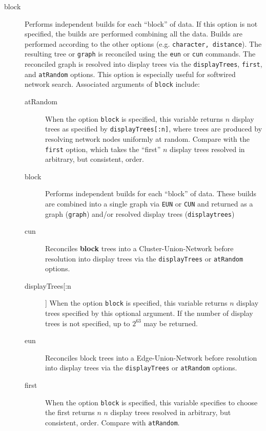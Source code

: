 	\begin{description}

		\item[block] Performs independent builds for each ``block'' of data. If this option 
		is not specified, the builds are performed combining all the data. Builds are performed 
		according 	to the other options (e.g. \texttt{character, distance}). The resulting tree 
		or \texttt{graph} is reconciled using the \texttt{eun} or \texttt{cun} commands. The 
		reconciled graph is resolved into display trees via the \texttt{displayTrees}, \texttt{first}, 
		and \texttt{atRandom} options. This option is especially useful for softwired network search. 
		Associated arguments of \texttt{block} include:
				
		\begin{description}
			\item[atRandom] When the option \texttt{block} is specified, this variable returns $n$ 
			display trees as specified by \texttt{displayTrees[:n]}, where trees are produced by 
			resolving network nodes uniformly at random. Compare with the \texttt{first} option, 
			which takes the ``first'' $n$ display trees resolved in arbitrary, but consistent, order.

			\item[block] Performs independent builds for each ``block'' of data.  These builds are combined
			into a single graph via \texttt{EUN} or \texttt{CUN} and returned as a graph (\texttt{graph}) and/or
			resolved display trees (\texttt{displaytrees})
			
			\item[cun] Reconciles \textbf {block} trees into a Cluster-Union-Network \citep{Baroni2005} 
			before resolution into display trees via the \texttt{displayTrees} or \texttt{atRandom} 
			options.
	
			\item[displayTrees[:n]] When the option \texttt{block} is specified, this variable 
			returns $n$ display trees specified by this optional argument. If the number of 
			display trees is not specified, up to $2^{63}$ may be returned.

			\item[eun] Reconciles block trees into a Edge-Union-Network \citep{MiyagiandWheeler2019, 
			Wheeler2022} before resolution into display trees via the \texttt{displayTrees} or 
			\texttt{atRandom} 
			options.

			\item[first] When the option \texttt{block} is specified, this variable specifies to 
			choose the first returns $n$ $n$ display trees resolved in arbitrary, but consistent, 
			order. Compare with 	\texttt{atRandom}.
			

\end{description}
\end{description}
